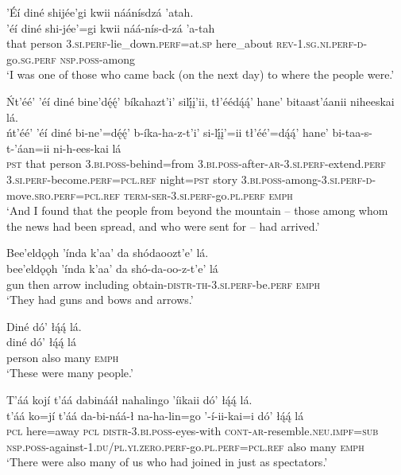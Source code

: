 \ea\label{ex:text1-45-2}
’Éí diné shijée’gi kwii náánísdzá ’atah.\\
\gll ’éí	diné	shi-jée’=gi	kwii	náá-nís-d-zá	’a-tah\\
     that	person	3.\textsc{si}.\textsc{perf}-lie\_down.\textsc{perf}=at.\textsc{sp}	here\_about	\textsc{rev}-1.\textsc{sg}.\textsc{ni}.\textsc{perf}-\textsc{d}-go.\textsc{sg}.\textsc{perf}	\textsc{nsp}.\textsc{poss}-among\\
\glt `I was one of those who came back (on the next day) to where the people were.'
\z

\ea\label{ex:text1-45-3}
Ńt’éé’ ’éí diné bine’dę́ę́’ bíkahazt’i’ silį́į’ii, tł’éédą́ą́’ hane’ bitaast’áanii niheeskai lá.\\
\gll ńt’éé’	’éí	diné	bi-ne’=dę́ę́’	b-íka-ha-z-t’i’	si-lį́į’=ii	tł’éé’=dą́ą́’	hane’	bi-taa-s-t-’áan=ii	ni-h-ees-kai	lá\\
     \textsc{pst}	that	person	3.\textsc{bi}.\textsc{poss}-behind=from	3.\textsc{bi}.\textsc{poss}-after-\textsc{ar}-3.\textsc{si}.\textsc{perf}-extend.\textsc{perf}	3.\textsc{si}.\textsc{perf}-become.\textsc{perf}=\textsc{pcl}.\textsc{ref}	night=\textsc{pst}	story	3.\textsc{bi}.\textsc{poss}-among-3.\textsc{si}.\textsc{perf}-\textsc{d}-move.\textsc{sro}.\textsc{perf}=\textsc{pcl}.\textsc{ref}	\textsc{term}-\textsc{ser}-3.\textsc{si}.\textsc{perf}-go.\textsc{pl}.\textsc{perf}	\textsc{emph}\\
\glt `And I found that the people from beyond the mountain -- those among whom the news had been spread, and who were sent for -- had arrived.'
\z

\ea\label{ex:text1-45-4}
Bee’eldǫǫh ’índa k’aa’ da shódaoozt’e’ lá.\\
\gll bee’eldǫǫh	’índa	k’aa’	da	shó-da-oo-z-t’e’	lá\\
     gun	then	arrow	including	obtain-\textsc{distr}-\textsc{th}-3.\textsc{si}.\textsc{perf}-be.\textsc{perf}	\textsc{emph}\\
\glt `They had guns and bows and arrows.'
\z

\ea\label{ex:text1-45-5}
Diné dó’ łą́ą́ lá.\\
\gll diné	dó’	łą́ą́	lá\\
     person	also	many	\textsc{emph}\\
\glt `These were many people.'
\z

\ea\label{ex:text1-45-6}
T’áá kojí t’áá dabinááł nahalingo ’íikaii dó’ łą́ą́ lá.\\
\gll t’áá	ko=jí	t’áá	da-bi-náá-ł	na-ha-lin=go	’-í-ii-kai=i	dó’	łą́ą́	lá\\
     \textsc{pcl}	here=away	\textsc{pcl}	\textsc{distr}-3.\textsc{bi}.\textsc{poss}-eyes-with	\textsc{cont}-\textsc{ar}-resemble.\textsc{neu}.\textsc{impf}=\textsc{sub}	\textsc{nsp}.\textsc{poss}-against-1.\textsc{du}/\textsc{pl}.\textsc{yi}.\textsc{zero}.\textsc{perf}-go.\textsc{pl}.\textsc{perf}=\textsc{pcl}.\textsc{ref}	also	many	\textsc{emph}\\
\glt `There were also many of us who had joined in just as spectators.'
\z

